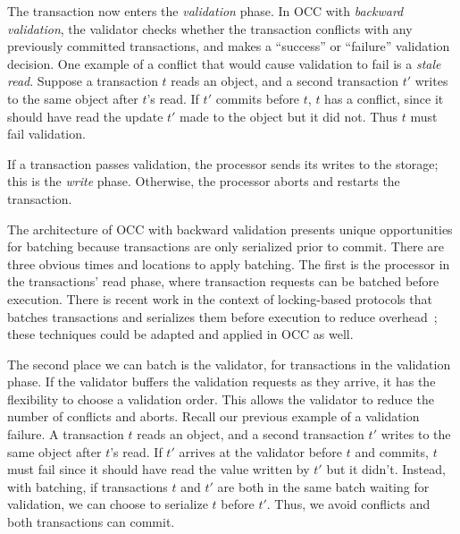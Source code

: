 The transaction now enters the \emph{validation} phase. In OCC with \emph{backward validation}, the validator checks whether the transaction conflicts with any previously committed transactions, and makes a ``success'' or ``failure'' validation decision. 
One example of a conflict that would cause validation to fail is a \emph{stale read}. Suppose a transaction $t$ reads an object, and a second transaction $t'$ writes to the same object after $t$'s read. If $t'$ commits before $t$, $t$ has a conflict, since it should have read the update $t'$ made to the object but it did not. Thus $t$ must fail validation. 


If a transaction passes validation, the processor sends its writes to the storage; this is the \emph{write} phase. Otherwise, the processor aborts and restarts the transaction.

The architecture of OCC with backward validation presents unique opportunities for batching because transactions are only serialized prior to commit. 
There are three obvious times and locations to apply batching. The first is the processor in the transactions' read phase, where transaction requests can be batched before execution. There is recent work in the context of locking-based protocols that  batches transactions and serializes them before execution to reduce overhead~\cite{faleiro2014rethinking,mu2014extracting,thomson2012calvin}; these techniques could be adapted and applied in OCC as well.

The second place we can batch is the validator, for transactions in the validation phase. If the validator buffers the validation requests as they arrive, it has the flexibility to choose a validation order. This allows the validator to reduce the number of conflicts and aborts. Recall our previous example of a validation failure. A transaction $t$ reads an object, and a second transaction $t'$ writes to the same object after $t$'s read. If $t'$ arrives at the validator before $t$ and commits, $t$ must fail since it should have read the value written by $t'$ but it didn't. Instead, with batching, if transactions $t$ and $t'$ are both in the same batch waiting for validation, we can choose to serialize $t$ before $t'$. Thus, we avoid conflicts and both transactions can commit.

